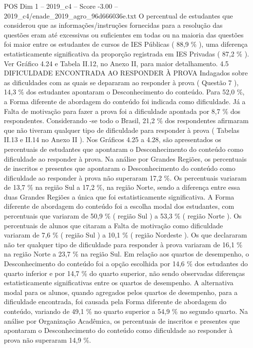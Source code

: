 \begin{textsample}{POS Dim 1 – 2019\_c4 – Score -3.00 – 2019\_c4/enade\_2019\_agro\_96d666036e.txt}
O percentual de estudantes que considerou que as informações/instruções fornecidas para a resolução das questões eram até excessivas ou suficientes em todas ou na maioria das questões foi maior entre os estudantes de cursos de IES Públicas ( 88,9 \% ), uma diferença estatisticamente significativa da proporção registrada em IES Privadas ( 87,2 \% ).
Ver Gráfico 4.24 e Tabela II.12, no Anexo II, para maior detalhamento. 4.5 DIFICULDADE ENCONTRADA AO RESPONDER À PROVA Indagados sobre as dificuldades com as quais se depararam ao responder à prova ( Questão 7 ), 14,3 \% dos estudantes apontaram o Desconhecimento do conteúdo.
Para 52,0 \%, a Forma diferente de abordagem do conteúdo foi indicada como dificuldade.
Já a Falta de motivação para fazer a prova foi a dificuldade apontada por 8,7 \% dos respondentes.
Considerando -se todo o Brasil, 21,2 \% dos respondentes afirmaram que não tiveram qualquer tipo de dificuldade para responder à prova ( Tabelas II.13 e II.14 no Anexo II ).
Nos Gráficos 4.25 a 4.28, são apresentados os percentuais de estudantes que apontaram o Desconhecimento do conteúdo como dificuldade ao responder à prova.
Na análise por Grandes Regiões, os percentuais de inscritos e presentes que apontaram o Desconhecimento do conteúdo como dificuldade ao responder à prova não superaram 17,2 \%.
Os percentuais variaram de 13,7 \% na região Sul a 17,2 \%, na região Norte, sendo a diferença entre essa duas Grandes Regiões a única que foi estatisticamente significativa.
A Forma diferente de abordagem do conteúdo foi a escolha modal dos estudantes, com percentuais que variaram de 50,9 \% ( região Sul ) a 53,3 \% ( região Norte ).
Os percentuais de alunos que citaram a Falta de motivação como dificuldade variaram de 7,6 \% ( região Sul ) a 10,1 \% ( região Nordeste ).
Os que declararam não ter qualquer tipo de dificuldade para responder à prova variaram de 16,1 \% na região Norte a 23,7 \% na região Sul.
Em relação aos quartos de desempenho, o Desconhecimento do conteúdo foi a opção escolhida por 14,6 \% dos estudantes do quarto inferior e por 14,7 \% do quarto superior, não sendo observadas diferenças estatisticamente significativas entre os quartos de desempenho.
A alternativa modal para os alunos, quando agregados pelos quartos de desempenho, para a dificuldade encontrada, foi causada pela Forma diferente de abordagem do conteúdo, variando de 49,1 \% no quarto superior a 54,9 \% no segundo quarto.
Na análise por Organização Acadêmica, os percentuais de inscritos e presentes que apontaram o Desconhecimento do conteúdo como dificuldade ao responder à prova não superaram 14,9 \%.

\end{textsample}
